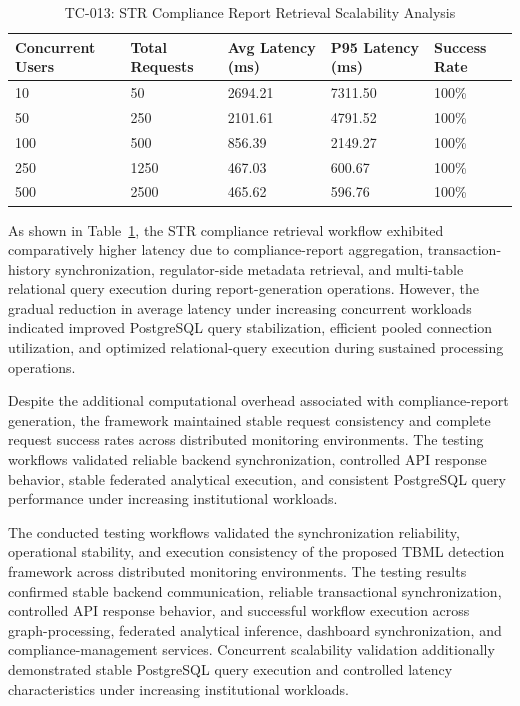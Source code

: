 \renewcommand{\arraystretch}{1.3}

\begin{table}[H]
\centering
\caption{TC-013: STR Compliance Report Retrieval Scalability Analysis}
\label{tab:str_compliance_report_retrieval_scalability_test}
\vspace{0.2cm}

\begin{tabular}{|p{2.6cm}|p{2.4cm}|p{2.8cm}|p{2.8cm}|p{2.2cm}|}
\hline
\textbf{Concurrent Users} & \textbf{Total Requests} & \textbf{Avg Latency (ms)} & \textbf{P95 Latency (ms)} & \textbf{Success Rate} \\ \hline
10 & 50 & 2694.21 & 7311.50 & 100\% \\ \hline
50 & 250 & 2101.61 & 4791.52 & 100\% \\ \hline
100 & 500 & 856.39 & 2149.27 & 100\% \\ \hline
250 & 1250 & 467.03 & 600.67 & 100\% \\ \hline
500 & 2500 & 465.62 & 596.76 & 100\% \\ \hline
\end{tabular}
\end{table}

\renewcommand{\arraystretch}{1}

As shown in Table~\ref{tab:str_compliance_report_retrieval_scalability_test}, the STR compliance retrieval workflow exhibited comparatively higher latency due to compliance-report aggregation, transaction-history synchronization, regulator-side metadata retrieval, and multi-table relational query execution during report-generation operations. However, the gradual reduction in average latency under increasing concurrent workloads indicated improved PostgreSQL query stabilization, efficient pooled connection utilization, and optimized relational-query execution during sustained processing operations.

Despite the additional computational overhead associated with compliance-report generation, the framework maintained stable request consistency and complete request success rates across distributed monitoring environments. The testing workflows validated reliable backend synchronization, controlled API response behavior, stable federated analytical execution, and consistent PostgreSQL query performance under increasing institutional workloads.


The conducted testing workflows validated the synchronization reliability, operational stability, and execution consistency of the proposed TBML detection framework across distributed monitoring environments. The testing results confirmed stable backend communication, reliable transactional synchronization, controlled API response behavior, and successful workflow execution across graph-processing, federated analytical inference, dashboard synchronization, and compliance-management services. Concurrent scalability validation additionally demonstrated stable PostgreSQL query execution and controlled latency characteristics under increasing institutional workloads.



